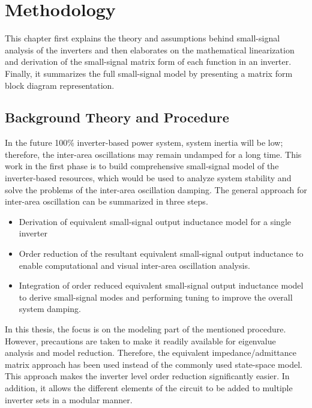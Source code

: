 \chapter{Methodology}\label{formulation}

This chapter first explains the theory and assumptions behind small-signal analysis of the inverters and then elaborates on the mathematical linearization and derivation of the small-signal matrix form of each function in an inverter. Finally, it summarizes the full small-signal model by presenting a matrix form block diagram representation.

\section{Background Theory and Procedure}\label{theory}

In the future 100\% inverter-based power system, system inertia will be low; therefore, the inter-area oscillations may remain undamped for a long time. This work in the first phase is to build comprehensive small-signal model of the inverter-based resources, which would be used to analyze system stability and solve the problems of the inter-area oscillation damping. The general approach for inter-area oscillation can be summarized in three steps.
\begin{itemize}
    \item Derivation of equivalent small-signal output inductance model for a single inverter
    \item Order reduction of the resultant equivalent small-signal output inductance to enable computational and visual inter-area oscillation analysis.
    \item 	Integration of order reduced equivalent small-signal output inductance model to derive small-signal modes and performing tuning to improve the overall system damping.
\end{itemize}

In this thesis, the focus is on the modeling part of the mentioned procedure. However, precautions are taken to make it readily available for eigenvalue analysis and model reduction. Therefore, the equivalent impedance/admittance matrix approach has been used instead of the commonly used state-space model. This approach makes the inverter level order reduction significantly easier. In addition, it allows the different elements of the circuit to be added to multiple inverter sets in a modular manner.


